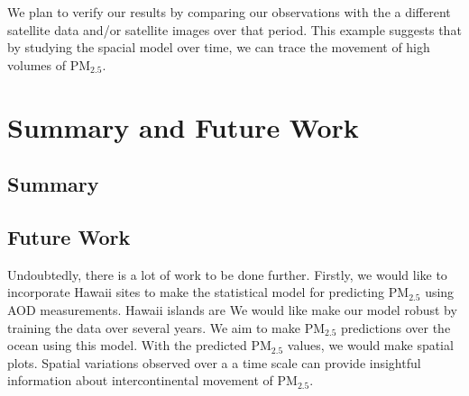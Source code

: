 \documentclass[10pt]{article}
\begin{document}
 We plan to verify our results by comparing our observations with the a different satellite data and/or satellite images over that period. This example suggests that by studying the spacial model over time, we can trace the movement of high volumes of PM$_{2.5}$.










\section{Summary and Future Work}
\subsection{Summary}

\subsection{Future Work}
Undoubtedly, there is a lot of work to be done further. Firstly, we would like to incorporate Hawaii sites to make the statistical model for predicting PM$_{2.5}$ using AOD measurements. Hawaii islands  are We would like make our model robust by training the data over several years.  We aim to make PM$_{2.5}$ predictions over the ocean using this model. With the predicted PM$_{2.5}$ values, we would make spatial plots. Spatial variations observed over a a time scale can provide insightful information about  intercontinental movement of PM$_{2.5}$. 
\end{document}
